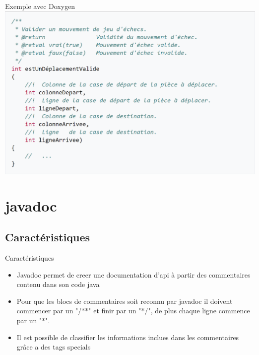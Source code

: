 \documentclass{beamer}
\begin{document}
\begin{frame}{Exemple avec Doxygen}
\includegraphics[scale=0.25]{Images/lol2.png}
\end{frame}










\section{javadoc}

\subsection{Caractéristiques}
\begin{frame}{Caractéristiques}
\begin{itemize}
\item {
    Javadoc permet de creer une documentation d'api à partir des commentaires contenu dans son code java
}
\item {
    Pour que les blocs de commentaires soit reconnu par javadoc il doivent commencer par un "/**" et finir par un "*/", de plus chaque ligne commence par un "*".
}
\item {
    Il est possible de classifier les informations inclues dans les commentaires grâce a des tags specials 
}
\end{itemize}
\end{frame}
\end{document}
